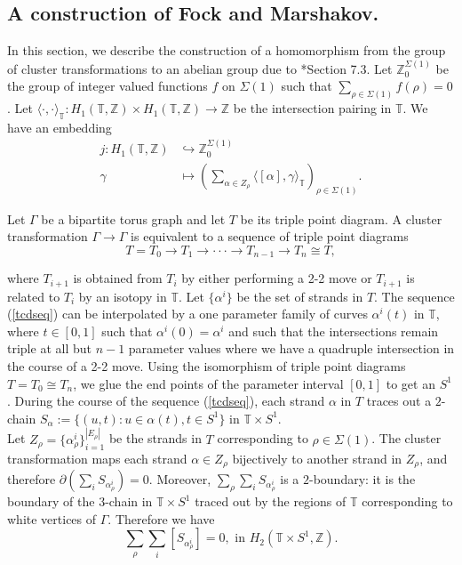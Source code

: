 \documentclass[11pt]{article} %
\theoremstyle{definition}
\newcommand{\Z}{{\mathbb Z}}
\newcommand{\T}{{\mathbb T}}
\newcommand{\ra}{\rightarrow}
\newcommand{\be}{\begin{equation}}
\newcommand{\ee}{\end{equation}}
\newcommand{\la}{\label}
\begin{document}
\subsection{A construction of Fock and Marshakov.}\la{sec:fockmarsh}
In this section, we describe the construction of a homomorphism from the group of cluster transformations to an abelian group due to \cite{FM16}*{Section 7.3}. Let $\Z^{\Sigma(1)}_0$ be the group of integer valued functions $f$ on $\Sigma(1)$ such that $\sum_{\rho \in \Sigma(1)} f(\rho)=0$. Let $\langle \cdot,\cdot \rangle_\T :H_1(\mathbb T,\Z) \times H_1(\mathbb T,\Z) \ra \Z$ be the intersection pairing in $\mathbb T$. We have an embedding
\begin{align*}
    j:H_1(\mathbb T,\Z) &\hookrightarrow \Z^{\Sigma(1)}_0\\
    \gamma &\mapsto \left( \sum_{\alpha \in Z_\rho} \langle [\alpha], \gamma \rangle_\T \right)_{\rho \in \Sigma(1)}.
\end{align*}

Let $\Gamma$ be a bipartite torus graph and let $T$ be its triple point diagram. A cluster transformation $\Gamma \ra \Gamma$ is equivalent to a sequence of triple point diagrams 
\be \label{tcdseq}
T=T_0 \ra T_1 \ra \cdot \cdot \cdot \ra T_{n-1} \ra T_n \cong T,
\ee

where $T_{i+1}$ is obtained from $T_i$ by either performing a 2-2 move or $T_{i+1}$ is related to $T_i$ by an isotopy in $\T$. Let $\{\alpha^i\}$ be the set of strands in $T$. The sequence (\ref{tcdseq}) can be interpolated by a one parameter family of curves $\alpha^i(t)$ in $\T$, where $t\in [0,1]$ such that $\alpha^i(0)=\alpha^i$ and such that the intersections remain triple at all but $n-1$ parameter values where we have a quadruple intersection in the course of a 2-2 move. Using the isomorphism of triple point diagrams $T=T_0 \cong T_n$, we glue the end points of the parameter interval $[0,1]$ to get an $S^1$. During the course of the sequence (\ref{tcdseq}), each strand $\alpha$ in $T$ traces out a $2$-chain $S_\alpha:=\{(u,t):u \in \alpha(t), t \in S^1\}$ in $\mathbb T \times S^1$.\\

Let $Z_\rho=\{\alpha^i_\rho\}_{i=1}^{|E_\rho|}$ be the strands in $T$ corresponding to $\rho \in \Sigma(1)$. The cluster transformation maps each strand $\alpha \in Z_\rho$ bijectively to another strand in $Z_\rho$, and therefore $\partial (\sum_i S_{\alpha_\rho^i})=0.$ Moreover, $\sum_\rho \sum_i S_{\alpha_\rho^i}$ is a $2$-boundary: it is the boundary of the $3$-chain in $\T \times S^1$ traced out by the regions of $\T$ corresponding to white vertices of $\Gamma$. Therefore  we have
\be \la{sumzero}
\sum_\rho \sum_i [S_{\alpha_\rho^i}]=0, \text{ in $H_2(\T \times S^1, \Z)$}.
\ee
\end{document}
